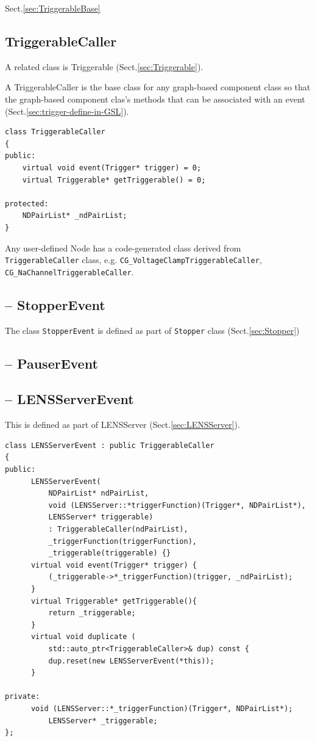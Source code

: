 Sect.\ref{sec:TriggerableBase}

\subsection{TriggerableCaller}
\label{sec:TriggerableCaller}


A related class is Triggerable (Sect.\ref{sec:Triggerable}).


A TriggerableCaller is the base class for any graph-based component
class so that the graph-based component clas's methods that can be associated
with an event (Sect.\ref{sec:trigger-define-in-GSL}).

\begin{verbatim}
class TriggerableCaller
{
public:
    virtual void event(Trigger* trigger) = 0;
    virtual Triggerable* getTriggerable() = 0;

protected:
    NDPairList* _ndPairList;
}
\end{verbatim}

Any user-defined Node has a code-generated class derived from
\verb!TriggerableCaller! class, e.g. \verb!CG_VoltageClampTriggerableCaller!,
\verb!CG_NaChannelTriggerableCaller!.

\subsection{-- StopperEvent}
\label{sec:StopperEvent}

The class \verb!StopperEvent! is defined as part of \verb!Stopper! class 
(Sect.\ref{sec:Stopper})

\subsection{-- PauserEvent}
\label{sec:PauserEvent}

\subsection{-- LENSServerEvent}
\label{sec:LENSServerEvent}

This is defined as part of LENSServer (Sect.\ref{sec:LENSServer}).
\begin{verbatim}
class LENSServerEvent : public TriggerableCaller
{
public:
	  LENSServerEvent(
		  NDPairList* ndPairList,
		  void (LENSServer::*triggerFunction)(Trigger*, NDPairList*),
		  LENSServer* triggerable) 
		  : TriggerableCaller(ndPairList), 
		  _triggerFunction(triggerFunction),
		  _triggerable(triggerable) {}
	  virtual void event(Trigger* trigger) {
		  (_triggerable->*_triggerFunction)(trigger, _ndPairList);
	  }
	  virtual Triggerable* getTriggerable(){
		  return _triggerable;
	  }
	  virtual void duplicate (
		  std::auto_ptr<TriggerableCaller>& dup) const {
		  dup.reset(new LENSServerEvent(*this));
	  }

private:
	  void (LENSServer::*_triggerFunction)(Trigger*, NDPairList*);
		  LENSServer* _triggerable;
};
\end{verbatim}


